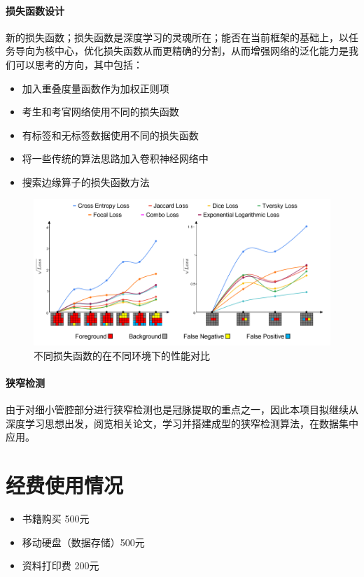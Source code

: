 \documentclass[lang=cn,11pt,a4paper,cite=numbers]{elegantpaper}
\begin{document}
\paragraph{损失函数设计}
新的损失函数；损失函数是深度学习的灵魂所在；能否在当前框架的基础上，以任务导向为核中心，优化损失函数从而更精确的分割，从而增强网络的泛化能力是我们可以思考的方向，其中包括：

\begin{itemize}
    \item 加入重叠度量函数作为加权正则项
    \item 考生和考官网络使用不同的损失函数
    \item 有标签和无标签数据使用不同的损失函数
    \item 将一些传统的算法思路加入卷积神经网络中
    \item 搜索边缘算子的损失函数方法
\end{itemize}

\begin{figure}[H]
    \centering
    \includegraphics[scale=0.6]{./image/后期展望/LossFunc.png}
    \caption{不同损失函数的在不同环境下的性能对比\cite{26}}
    \label{fig:LossFunc}
\end{figure}

\paragraph{狭窄检测}
由于对细小管腔部分进行狭窄检测也是冠脉提取的重点之一，因此本项目拟继续从深度学习思想出发，阅览相关论文，学习并搭建成型的狭窄检测算法，在数据集中应用。

\section{经费使用情况}

\begin{itemize}
    \item 书籍购买 500元 
    \item 移动硬盘（数据存储）500元 
    \item 资料打印费 200元
\end{itemize}


\end{document}

